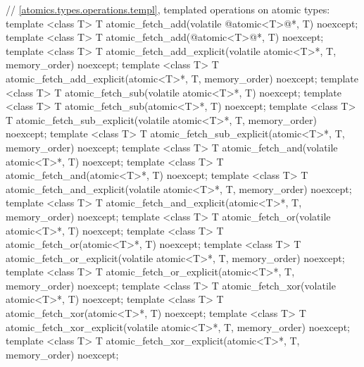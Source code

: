 \begin{codeblock}
{  // \ref{atomics.types.operations.templ}, templated operations on atomic types:
  template <class T>
    T atomic_fetch_add(volatile @atomic<T>@*, T) noexcept;
  template <class T>
    T atomic_fetch_add(@atomic<T>@*, T) noexcept;
  template <class T>
    T atomic_fetch_add_explicit(volatile atomic<T>*, T, memory_order) noexcept;
  template <class T>
    T atomic_fetch_add_explicit(atomic<T>*, T, memory_order) noexcept;
  template <class T>
    T atomic_fetch_sub(volatile atomic<T>*, T) noexcept;
  template <class T>
    T atomic_fetch_sub(atomic<T>*, T) noexcept;
  template <class T>
    T atomic_fetch_sub_explicit(volatile atomic<T>*, T, memory_order) noexcept;
  template <class T>
    T atomic_fetch_sub_explicit(atomic<T>*, T, memory_order) noexcept;
  template <class T>
    T atomic_fetch_and(volatile atomic<T>*, T) noexcept;
  template <class T>
    T atomic_fetch_and(atomic<T>*, T) noexcept;
  template <class T>
    T atomic_fetch_and_explicit(volatile atomic<T>*, T, memory_order) noexcept;
  template <class T>
    T atomic_fetch_and_explicit(atomic<T>*, T, memory_order) noexcept;
  template <class T>
    T atomic_fetch_or(volatile atomic<T>*, T) noexcept;
  template <class T>
    T atomic_fetch_or(atomic<T>*, T) noexcept;
  template <class T>
    T atomic_fetch_or_explicit(volatile atomic<T>*, T, memory_order) noexcept;
  template <class T>
    T atomic_fetch_or_explicit(atomic<T>*, T, memory_order) noexcept;
  template <class T>
    T atomic_fetch_xor(volatile atomic<T>*, T) noexcept;
  template <class T>
    T atomic_fetch_xor(atomic<T>*, T) noexcept;
  template <class T>
    T atomic_fetch_xor_explicit(volatile atomic<T>*, T, memory_order) noexcept;
  template <class T>
    T atomic_fetch_xor_explicit(atomic<T>*, T, memory_order) noexcept;

}
\end{codeblock}

